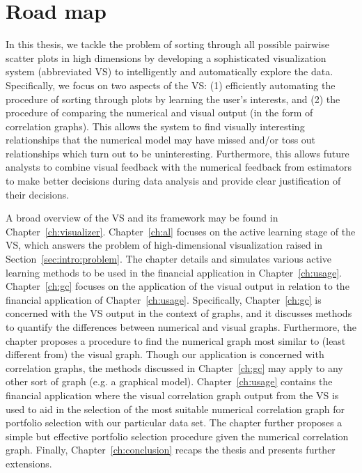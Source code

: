 \section{Road map}
\label{sec:intro:summary}

In this thesis, we tackle the problem of sorting through all possible pairwise
scatter plots in high dimensions by developing a sophisticated visualization
system (abbreviated VS) to intelligently and automatically explore the data. 
Specifically, we focus on two aspects of the VS: 
(1) efficiently automating the procedure of sorting through plots by learning 
the user's interests, and (2) the procedure of comparing the numerical and 
visual output (in the form of correlation graphs).
This allows the system to find visually interesting relationships that the
numerical model may have missed and/or toss out relationships which turn out to
be uninteresting. Furthermore, this allows future analysts to combine visual
feedback with the numerical feedback from estimators to make better decisions
during data analysis and provide clear justification of their decisions.

A broad overview of the VS and its framework may be found in
Chapter~\ref{ch:visualizer}. Chapter~\ref{ch:al} focuses on the active
learning stage of the VS, which answers the problem of high-dimensional 
visualization raised in Section~\ref{sec:intro:problem}. 
The chapter details and simulates various active learning methods to be used in 
the financial application in Chapter~\ref{ch:usage}. 
Chapter~\ref{ch:gc} focuses on the application of the visual output in relation 
to the financial application of Chapter~\ref{ch:usage}. Specifically, 
Chapter~\ref{ch:gc} is concerned with the VS output in the context of graphs, 
and it discusses methods to 
quantify the differences between numerical and visual graphs. Furthermore, the 
chapter proposes a procedure to find the numerical graph most similar to (least 
different from) the visual graph. Though our  application is concerned with 
correlation graphs, the methods discussed in Chapter~\ref{ch:gc} may apply to 
any other sort of graph (e.g. a graphical model). 
Chapter~\ref{ch:usage} contains the financial application where the 
visual correlation graph output from the VS is used to aid in the selection of 
the most suitable numerical correlation graph for portfolio selection with our 
particular data set. The chapter further proposes a simple but effective 
portfolio selection procedure given the numerical correlation graph.
Finally, Chapter~\ref{ch:conclusion} recaps the thesis and presents further 
extensions.


